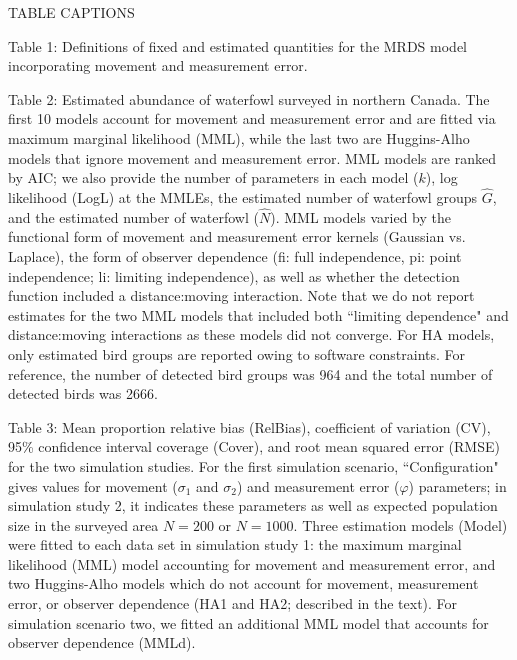 \documentclass[12pt,fleqn]{article}
\begin{document}



\pagebreak
TABLE CAPTIONS

Table 1: Definitions of fixed and estimated quantities for the MRDS model incorporating movement and measurement error.

\vspace{.3cm} 

Table 2: Estimated abundance of waterfowl surveyed in northern Canada.  The first 10 models account for movement and measurement error and are fitted via maximum marginal likelihood (MML), while the last two are Huggins-Alho models that ignore movement and measurement error.  MML models are ranked by AIC; we also provide the number of parameters in each model ($k$), log likelihood (LogL) at the MMLEs, the estimated number of waterfowl groups $\hat{G}$, and the estimated number of waterfowl ($\hat{N}$).  MML models varied by the functional form of movement and measurement error kernels (Gaussian vs. Laplace), the form of observer dependence (fi: full independence, pi: point independence; li: limiting independence),  as well as whether the detection function included a distance:moving interaction.  Note that we do not report estimates for the two MML models that included both ``limiting dependence" and distance:moving interactions as these models did not converge.  For HA models, only estimated bird groups are reported owing to software constraints. For reference, the number of detected bird groups was 964 and the total number of detected birds was 2666.

\vspace{.3cm}

Table 3: Mean proportion relative bias (RelBias), coefficient of variation (CV), 95\% confidence interval coverage (Cover), and root mean squared error (RMSE) for the two simulation studies. For the first simulation scenario, ``Configuration" gives values for movement ($\sigma_1$ and $\sigma_2$) and measurement error ($\varphi$) parameters; in simulation study 2, it indicates these parameters as well as expected population size in the surveyed area $N=200$ or $N=1000$.  Three estimation models (Model) were fitted to each data set in simulation study 1: the maximum marginal likelihood (MML) model accounting for movement and measurement error, and two Huggins-Alho models which do not account for movement, measurement error, or observer dependence (HA1 and HA2; described in the text).  For simulation scenario two, we fitted an additional MML model that accounts for observer dependence (MMLd).
\end{document}
